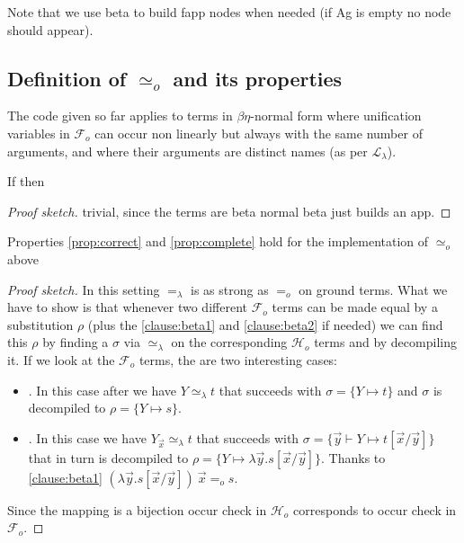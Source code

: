 \documentclass[sigconf,natbib=false,review]{acmart}
\newcommand{\EqualRel}{\ensuremath{=}}
\newcommand{\UnifRel}{\ensuremath{\simeq}}
\newcommand{\Uo}{\ensuremath{\UnifRel_o}\xspace}
\newcommand{\Eo}{\ensuremath{\EqualRel_o}\xspace}
\newcommand{\Ue}{\ensuremath{\UnifRel_\lambda}\xspace}
\newcommand{\Ee}{\ensuremath{\EqualRel_\lambda}\xspace}
\newcommand{\llambda}{\ensuremath{\mathcal{L}_\lambda}\xspace}
\newcommand{\Fo}{\ensuremath{\mathcal{F}_{\!o}\xspace}} %
\newcommand{\Ho}{\ensuremath{\mathcal{H}_o}\xspace}
\begin{document}


\noindent
Note that we use beta to build fapp nodes when needed (if Ag is empty
no  node should appear).

\subsection{Definition of \Uo and its properties}



The code given so far applies to terms in $\beta\eta$-normal form where
unification variables in \Fo{} can occur non linearly but always with
the same number of arguments, and where their arguments are distinct names
(as per \llambda).

\begin{lemma} If
   then 
\end{lemma}
\begin{proof}[Proof sketch]
trivial, since the terms are beta normal beta just builds an app.
\end{proof}


\begin{lemma}
Properties \ref{prop:correct} and
\ref{prop:complete} hold for the implementation of \Uo above
\end{lemma}
\begin{proof}[Proof sketch]
 In this setting \Ee is as strong as
\Eo on ground terms. What we have to show is that whenever two different \Fo
terms can be made equal by a substitution $\rho$ (plus the \ref{clause:beta1}
and \ref{clause:beta2} if needed) we can find this $\rho$ by finding
a $\sigma$ via \Ue{} on the corresponding \Ho terms and by decompiling it.
If we look at the \Fo{} terms, the are two interesting cases:
\begin{itemize}
\item \elpiIn{fuva X ~\Uo~s}. In this case after  we have
  $Y \Ue t$ that succeeds with $\sigma = \{ Y \mapsto t\}$ and
  $\sigma$ is decompiled to $\rho = \{ Y \mapsto s\}$.
\item \elpiIn{fapp[fuva X|L] ~\Uo~s}. In this case
 we have $Y_{\vec{x}} \Ue t$ that succeeds with
 $\sigma = \{ \vec{y} \vdash Y \mapsto t[\vec{x}/\vec{y}]\}$ that in turn
 is decompiled to $\rho = \{ Y \mapsto \lambda \vec{y}.s[\vec{x}/\vec{y}]\}$.
 Thanks to \ref{clause:beta1}
 $(\lambda \vec{y}.s[\vec{x}/\vec{y}])~\vec{x} \Eo s$.
\end{itemize}
Since the mapping is a bijection occur check in \Ho{} corresponds to occur
check in \Fo{}.
\end{proof}
\end{document}
